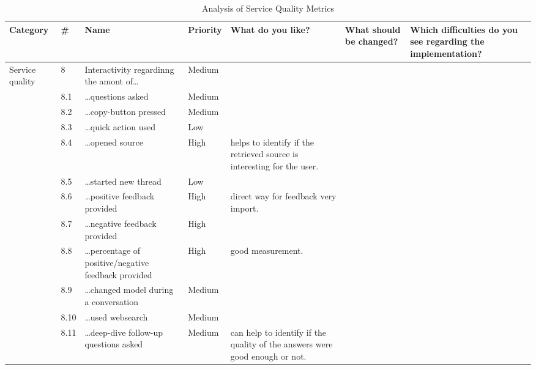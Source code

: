 \documentclass[
	english,
	ruledheaders=section,%
	class=report,%
	thesis={type=bachelor},%
	accentcolor=1b,%
	custommargins=true,%
	marginpar=false,%
	parskip=half-,%
	fontsize=11pt,%
	DIV=14,
]{tudapub}
\begin{document}
\begin{table}
    \centering
    \small 
    \caption{Analysis of Service Quality Metrics}
    \label{tab:service_quality}
    \begin{tabularx}{\textheight}{p{2.2cm} l >{\RaggedRight\arraybackslash}X l >{\RaggedRight\arraybackslash}X >{\RaggedRight\arraybackslash}X >{\RaggedRight\arraybackslash}X}
        \toprule
        \textbf{Category} & \textbf{\#} & \textbf{Name} & \textbf{Priority} & \textbf{What do you like?} & \textbf{What should be changed?} & \textbf{Which difficulties do you see regarding the implementation?} \\
        \midrule
        \multirow{12}{=}{Service quality} 
        & 8 & Interactivity regardinng the amont of\dots & Medium & & & \\
        \cmidrule(l){2-7}
        & 8.1 & \dots questions asked & Medium & & & \\
        \cmidrule(l){2-7}
        & 8.2 & \dots copy-button pressed & Medium & & & \\
        \cmidrule(l){2-7}
        & 8.3 & \dots quick action used & Low & & & \\
        \cmidrule(l){2-7}
        & 8.4 & \dots opened source & High & helps to identify if the retrieved source is interesting for the user. & & \\
        \cmidrule(l){2-7}
        & 8.5 & \dots started new thread & Low & & & \\
        \cmidrule(l){2-7}
        & 8.6 & \dots positive feedback provided & High & direct way for feedback very import. & & \\
        \cmidrule(l){2-7}
        & 8.7 & \dots negative feedback provided & High & & & \\
        \cmidrule(l){2-7}
        & 8.8 & \dots percentage of positive/negative feedback provided & High & good measurement. & & \\
        \cmidrule(l){2-7}
        & 8.9 & \dots changed model during a conversation & Medium & & & \\
        \cmidrule(l){2-7}
        & 8.10 & \dots used websearch & Medium & & & \\
        \cmidrule(l){2-7}
        & 8.11 & \dots deep-dive follow-up questions asked & Medium & can help to identify if the quality of the answers were good enough or not. & & \\
        \bottomrule
    \end{tabularx}
\end{table}
\end{document}
